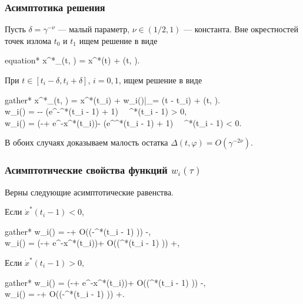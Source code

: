 \begin{frame}
	\frametitle{Асимптотика решения}
	
	\footnotesize
	Пусть $\delta = \gamma^{-\nu}$ --- малый параметр, $\nu \in (1/2, 1)$ --- константа.
	Вне окрестностей точек излома $t_0$ и $t_1$ ищем решение в виде
	\begin{empheq}[box=\myeq]{equation*}
	x^*_\gamma(t, \varphi) = x^*(t) + \Delta(t, \varphi).
	\end{empheq}
	
	При $t \in [t_i - \delta, t_i + \delta]$, $i = 0, 1$, ищем решение в виде
	\begin{empheq}[box=\myeq]{gather*}
	x^*_\gamma(t, \varphi) = x^*(t_i) +  w_i(\tau)|_{\tau = \gamma(t - t_i)} + \Delta(t, \varphi).\\
	w_i(\tau) = -\beta \tau -  \ln\left(e^{-^*(t_i - 1)\tau} + 1\right) \,  \, ^*(t_i - 1) > 0,\\
	w_i(\tau) = (-\beta + \alpha e^{-x^*(t_i)})\tau -  \ln\left(e^{^*(t_i - 1)\tau} + 1\right) \,  \, ^*(t_i - 1) < 0.
	\end{empheq}
	
	В обоих случаях доказываем малость остатка $\Delta(t, \varphi) = O(\gamma^{-2\nu})$.
	\normalsize
\end{frame}


\begin{frame}
	\frametitle{Асимптотические свойства функций $w_i(\tau)$}
	Верны следующие асимптотические равенства.
	
	\medskip
	
	Если $\dot{x}^*(t_i - 1) < 0$,
	\begin{empheq}[box=\myeq]{gather*}
		w_i(\tau) = -\beta \tau + O(\exp(-^*(t_i - 1) \tau))  \tau \to -\infty,\\
		w_i(\tau) = (-\beta + \alpha e^{-x^*(t_i)})\tau + O(\exp(^*(t_i - 1) \tau))  \tau \to +\infty,
	\end{empheq}
	
	Если $\dot{x}^*(t_i - 1) > 0$,
	\begin{empheq}[box=\myeq]{gather*}
		w_i(\tau) = (-\beta + \alpha e^{-x^*(t_i)})\tau + O(\exp(^*(t_i - 1) \tau))  \tau \to -\infty,\\
		w_i(\tau) = -\beta \tau + O(\exp(-^*(t_i - 1) \tau))  \tau \to +\infty.
	\end{empheq}
\end{frame}

